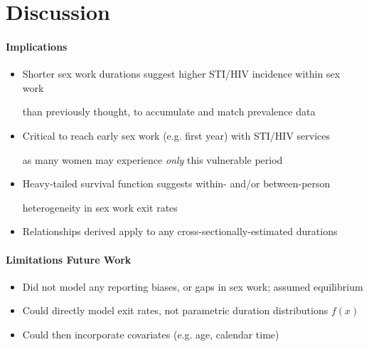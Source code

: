 \section{Discussion}
\paragraph{Implications}
\begin{itemize}
  \item Shorter sex work durations suggest higher STI/HIV incidence within sex work
   \par than previously thought, to accumulate and match prevalence data \cite{Knight2020}
  \item Critical to reach early sex work (e.g. first year) with STI/HIV services
   \par as many women may experience \emph{only} this vulnerable period \cite{Cheuk2020}
  \item Heavy-tailed survival function suggests within- and/or between-person
   \par heterogeneity in sex work exit rates \cite{Balan2020}
  \item Relationships derived apply to any cross-sectionally-estimated durations
\end{itemize}
\paragraph{Limitations \txn{\textbf{\&}} Future Work}
\begin{itemize}
  \item Did not model any reporting biases, or gaps in sex work; assumed equilibrium
  \item Could directly model exit rates, not parametric duration distributions $f(x)$
  \item Could then incorporate covariates (e.g. age, calendar time)
\end{itemize}
